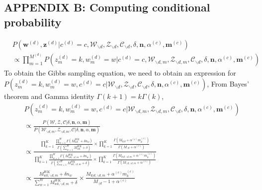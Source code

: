 \documentclass[a4paper]{article}
\begin{document}
\subsection*{APPENDIX B: Computing conditional probability}
\begin{equation}
\begin{aligned}
& P(\boldsymbol{w}^{(d)}, \boldsymbol{z}^{(d)}|c^{(d)}=c, \mathcal{W}_{\backslash d}, \mathcal{Z}_{\backslash d}, \mathcal{C}_{\backslash d}, \delta, \boldsymbol{n}, \alpha^{(c)}, \boldsymbol{m}^{(c)}) \\& \propto \prod_{m=1}^{M^{(d)}}P(z^{(d)}_m=k, w^{(d)}_m=w| c^{(d)}=c, \mathcal{W}_{\backslash d, m}, \mathcal{Z}_{\backslash d,m}, \mathcal{C}_{\backslash d}, \delta, \boldsymbol{n}, \alpha^{(c)}, \boldsymbol{m}^{(c)})
\end{aligned}
\end{equation} 
To obtain the Gibbs sampling equation, we need to obtain an expression for $P(z^{(d)}_m=k,  w^{(d)}_m=w, c^{(d)}=c|\mathcal{W}_{\backslash d}, \mathcal{Z}_{\backslash d}, \mathcal{C}_{\backslash d}, \delta, \boldsymbol{n}, \alpha^{(c)}, \boldsymbol{m}^{(c)})$,
 From Bayes' theorem and Gamma identity $\Gamma(k+1)=k\Gamma(k)$,
\begin{equation}
\begin{aligned}
& P(z^{(d)}_m=k, w^{(d)}_m=w, c^{(d)}=c|\mathcal{W}_{\backslash d, m}, \mathcal{Z}_{\backslash d,m}, \mathcal{C}_{\backslash d}, \delta, \boldsymbol{n}, \alpha^{(c)}, \boldsymbol{m}^{(c)}) \\& \propto 
\frac{P(\mathcal{W}, \mathcal{Z}, \mathcal{C}|\delta, \boldsymbol{n}, \alpha, \boldsymbol{m})}{P(\mathcal{W}_{\backslash d, m}, \mathcal{Z}_{\backslash d, m}, \mathcal{C}|\delta, \boldsymbol{n}, \alpha, \boldsymbol{m})}\\& \propto \frac{\prod_{k=1}^{K}\frac{\prod_{w=1}^W\Gamma(M_{wk}^{WK}+\delta n_w)}{\Gamma(\sum_{w=1}^WM_{wk}^{WK}+\delta )}\times\prod_{k=1}^K\frac{\Gamma(M_{k|d}+\alpha^{(c)} m^{(c)}_k)}{\Gamma(M_{\cdot|d}+\alpha^{(c)})}}{\prod_{k=1}^{K}\frac{\prod_{w=1}^W\Gamma(M_{wk, \backslash d, m}^{WK}+\delta n_w)}{\Gamma(\sum_{w=1}^WM_{wk, \backslash d, m}^{WK}+\delta )}\times\prod_{k=1}^K\frac{\Gamma(M_{k|d, \backslash d, m}+\alpha^{(c)} m^{(c)}_k)}{\Gamma(M_{\cdot|d, \backslash d, m}+\alpha^{(c)})}}\\ & \propto 
\frac{M_{wk, \backslash d, m}^{WK}+\delta n_w}{\sum_{w=1}^WM_{wk,  \backslash d, m}^{WK}+\delta}\times\frac{M_{k|d, \backslash d, m}+\alpha^{(c)} m^{(c)}_k}{M_{\cdot|d}-1+\alpha^{(c)}}
\end{aligned}
\end{equation}
\end{document}
